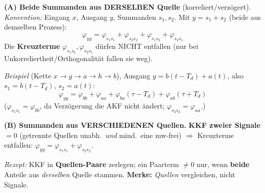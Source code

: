 \noindent\footnotesize
\textbf{(A) Beide Summanden aus DERSELBEN Quelle} (korreliert/verzögert).\;
  \emph{Konvention:} Eingang $x$, Ausgang $y$, Summanden $s_1,s_2$.\;
  Mit $y{=}s_1{+}s_2$ (beide aus demselben Prozess):
  \[\varphi_{yy}=\varphi_{s_1s_1}+\varphi_{s_2s_2}+\varphi_{s_1s_2}+\varphi_{s_2s_1}\]
  Die \textbf{Kreuzterme} $\varphi_{s_1s_2},\varphi_{s_2s_1}$ dürfen NICHT entfallen
  (nur bei Unkorreliertheit/Orthogonalität fallen sie weg).\par
  \vspace{0.15em}
  \textit{Beispiel} (Kette $x\to g\to a\to h\to b$), Ausgang
  $y{=}b(t{-}T_d){+}a(t)$, also $s_1{=}b(t{-}T_d)$, $s_2{=}a(t)$:
  \[\varphi_{yy}=\varphi_{bb}+\varphi_{aa}+\varphi_{ba}(\tau{-}T_d)+\varphi_{ab}(\tau{+}T_d)\]
  ($\varphi_{s_1s_1}{=}\varphi_{bb}$, da Verzögerung die AKF nicht ändert;
  $\varphi_{s_2s_2}{=}\varphi_{aa}$.)\par
  \vspace{0.25em}
  {\centering
  \par}
  \vspace{0.3em}
  \textbf{(B) Summanden aus VERSCHIEDENEN Quellen.}\;
  \textbf{KKF zweier Signale $=0$} (getrennte Quellen unabh.\ \emph{und} mind.\ eine mw-frei)
  $\Rightarrow$ Kreuzterme entfallen: $\varphi_{yy}=\varphi_{s_1s_1}+\varphi_{s_2s_2}$.\par
  \vspace{0.1em}
  \emph{Rezept:} KKF in \textbf{Quellen-Paare} zerlegen; ein Paarterm $\neq0$ nur,
  wenn \textbf{beide} Anteile aus \emph{derselben} Quelle stammen.\;
  \textbf{Merke:} \emph{Quellen} vergleichen, nicht Signale.
\bereichende

